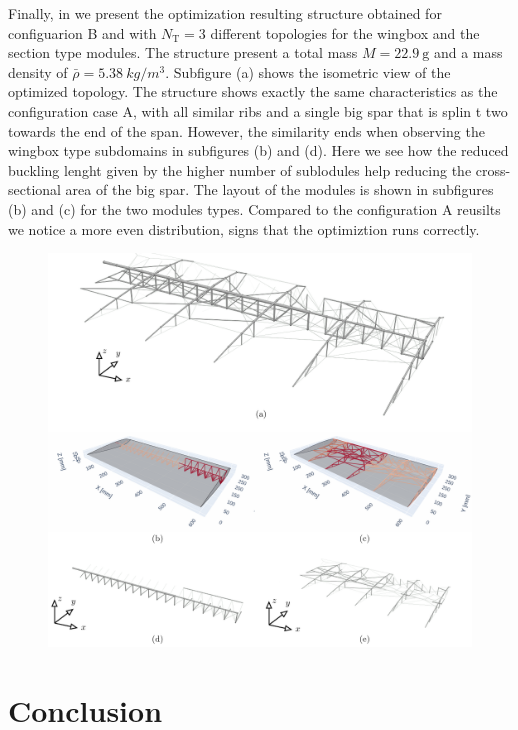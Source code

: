 Finally, in  we present the optimization resulting structure obtained for configuarion B and with $N_\text{T}=3$ different topologies for the wingbox and the section type modules. The structure present a total mass $M=\qty{22.9}{\gram}$ and a mass density of $\bar{\rho}=\qty{5.38}{kg/m^3}$. Subfigure (a) shows the isometric view of the optimized topology. The structure shows exactly the same characteristics as the configuration case A, with all similar ribs and a single big spar that is splin t two towards the end of the span. However, the similarity ends when observing the wingbox type subdomains in subfigures (b) and (d). Here we see how the reduced buckling lenght given by the higher number of sublodules help reducing the cross-sectional area of the big spar. The layout of the modules is shown in subfigures (b) and (c) for the two modules types. Compared to the configuration A reusilts we notice a more even distribution, signs that the optimiztion runs correctly.

\begin{figure}
    \centering
    \includegraphics[width=\linewidth]{figures/07_aeronautic/00_NACA_b_sol_3/gs_a.pdf}
        \caption{}
    \label{fig:07_topology_naca_b}
\end{figure}

\section{Conclusion}